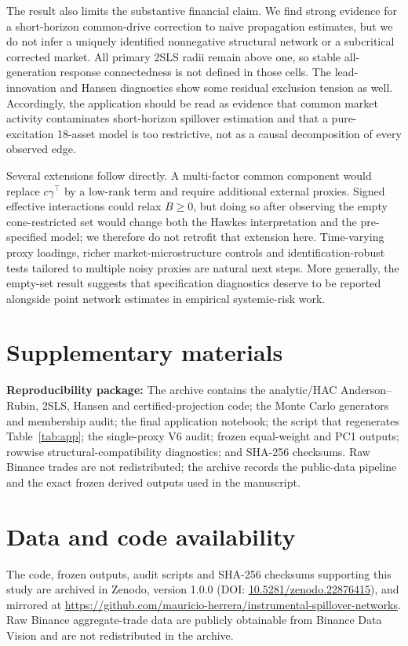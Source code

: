 \documentclass[12pt]{article}
\theoremstyle{plain}\newtheorem{theorem}{Theorem}[section]\newtheorem{proposition}[theorem]{Proposition}\newtheorem{lemma}[theorem]{Lemma}\newtheorem{corollary}[theorem]{Corollary}
\theoremstyle{definition}\newtheorem{definition}[theorem]{Definition}\newtheorem{assumption}[theorem]{Assumption}\newtheorem{remark}[theorem]{Remark}
\begin{document}
The result also limits the substantive financial claim. We find strong evidence for a short-horizon common-drive correction to naive propagation estimates, but we do not infer a uniquely identified nonnegative structural network or a subcritical corrected market. All primary 2SLS radii remain above one, so stable all-generation response connectedness is not defined in those cells. The lead-innovation and Hansen diagnostics show some residual exclusion tension as well. Accordingly, the application should be read as evidence that common market activity contaminates short-horizon spillover estimation and that a pure-excitation 18-asset model is too restrictive, not as a causal decomposition of every observed edge.

Several extensions follow directly. A multi-factor common component would replace $c\gamma^{\top}$ by a low-rank term and require additional external proxies. Signed effective interactions could relax $B\ge0$, but doing so after observing the empty cone-restricted set would change both the Hawkes interpretation and the pre-specified model; we therefore do not retrofit that extension here. Time-varying proxy loadings, richer market-microstructure controls and identification-robust tests tailored to multiple noisy proxies are natural next steps. More generally, the empty-set result suggests that specification diagnostics deserve to be reported alongside point network estimates in empirical systemic-risk work.

\section*{Supplementary materials}
\textbf{Reproducibility package:} The archive contains the analytic/HAC Anderson--Rubin, 2SLS, Hansen and certified-projection code; the Monte Carlo generators and membership audit; the final application notebook; the script that regenerates Table~\ref{tab:app}; the single-proxy V6 audit; frozen equal-weight and PC1 outputs; rowwise structural-compatibility diagnostics; and SHA-256 checksums. Raw Binance trades are not redistributed; the archive records the public-data pipeline and the exact frozen derived outputs used in the manuscript.

\section*{Data and code availability}
The code, frozen outputs, audit scripts and SHA-256 checksums supporting this study are archived in Zenodo, version 1.0.0 (DOI: \href{https://doi.org/10.5281/zenodo.22876415}{10.5281/zenodo.22876415}), and mirrored at \url{https://github.com/mauricio-herrera/instrumental-spillover-networks}. Raw Binance aggregate-trade data are publicly obtainable from Binance Data Vision and are not redistributed in the archive.
\end{document}
